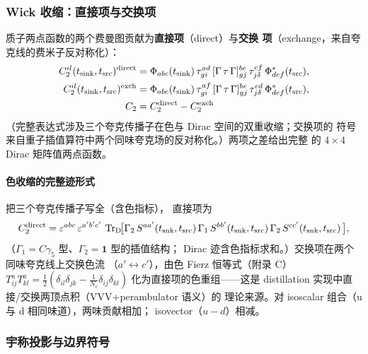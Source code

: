 \documentclass[11pt,a4paper]{ctexart}
\newcommand{\eps}{\varepsilon}
\newcommand{\tr}{\operatorname{Tr}}
\begin{document}
\subsubsection{Wick 收缩：直接项与交换项}

质子两点函数的两个费曼图贡献为\textbf{直接项}（direct）与\textbf{交换
项}（exchange，来自夸克线的费米子反对称化）：
\begin{align}
C_2^{il}(t_{\text{sink}}, t_{\text{src}})^{\rm direct} &=
\Phi_{abc}(t_{\rm sink}) \, \tau^{ad}_{g i} \,
[\Gamma\,\tau\,\Gamma]^{be}_{g j} \,
\tau^{cf}_{j\delta}\,\Phi^{*}_{def}(t_{\rm src}),
\label{eq:c2-direct}\\
C_2^{il}(t_{\text{sink}}, t_{\text{src}})^{\rm exch} &=
\Phi_{abc}(t_{\rm sink}) \, \tau^{af}_{g i} \,
[\Gamma\,\tau\,\Gamma]^{be}_{g j} \,
\tau^{cd}_{j\delta}\,\Phi^{*}_{def}(t_{\rm src}),
\label{eq:c2-exch}\\
C_2 &= C_2^{\rm direct} - C_2^{\rm exch}
\label{eq:c2-total}
\end{align}
（完整表达式涉及三个夸克传播子在色与 Dirac 空间的双重收缩；交换项的
符号来自重子插值算符中两个同味夸克场的反对称化。）两项之差给出完整
的 $4\times4$ Dirac 矩阵值两点函数。

\paragraph{色收缩的完整迹形式}把三个夸克传播子写全（含色指标），
直接项为
\begin{equation}\label{eq:c2-color-trace}
C_2^{\rm direct} =
\eps^{abc}\,\eps^{a'b'c'}\,
\tr_{\rm D}\!\bigl[\Gamma_2\,S^{aa'}(t_{\rm snk},t_{\rm src})\,
\Gamma_1\,S^{bb'}(t_{\rm snk},t_{\rm src})\,
\Gamma_2\,S^{cc'}(t_{\rm snk},t_{\rm src})\,\bigr],
\end{equation}
（$\Gamma_1=C\gamma_5$ 型、$\Gamma_2=\mathbf1$ 型的插值结构；
Dirac 迹含色指标求和。）交换项在两个同味夸克线上交换色流
（$a'\leftrightarrow c'$），由色 Fierz 恒等式（附录 C）
$T^a_{ij}T^a_{kl}=\frac12(\delta_{il}\delta_{jk}
-\frac{1}{N_c}\delta_{ij}\delta_{kl})$ 化为直接项的色重组——这是
distillation 实现中直接/交换两顶点积（VVV+perambulator 语义）的
理论来源。对 isoscalar 组合（u 与 d 相同味道），两味贡献相加；
isovector（$u-d$）相减。

\subsubsection{宇称投影与边界符号}
\end{document}
